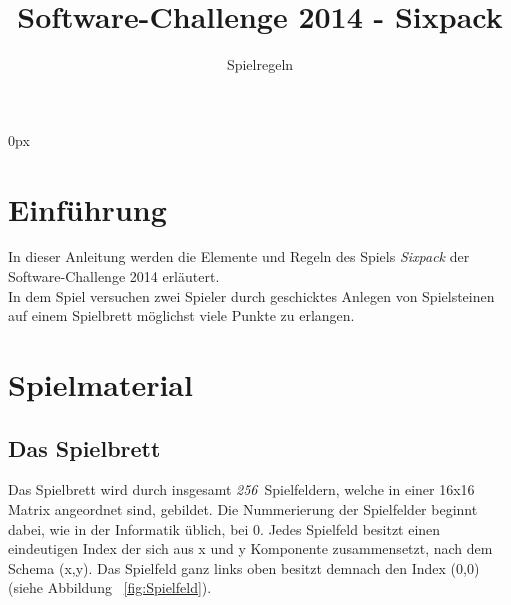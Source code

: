 \documentclass[a4paper, ngerman]{scrartcl}
\title{Software-Challenge 2014 - Sixpack}
\subtitle{Spielregeln}
\newcommand{\SpielFelderAnzahl}{\emph{256}}
\begin{document}
\parindent0px
\maketitle

\begin{figure}[h]
	\centering
\end{figure}
\vspace*{\fill}

\newpage
\tableofcontents
\newpage

\section{Einführung}
In dieser Anleitung werden die Elemente und Regeln des Spiels \emph{Sixpack}
der Software-Challenge 2014 erläutert.\\
In dem Spiel versuchen zwei Spieler durch geschicktes Anlegen von Spielsteinen auf einem Spielbrett möglichst viele Punkte zu erlangen.

\section{Spielmaterial}
	\subsection{Das Spielbrett}
Das Spielbrett wird durch insgesamt \SpielFelderAnzahl\ Spielfeldern, welche in einer 16x16 Matrix angeordnet sind, gebildet. Die Nummerierung der Spielfelder beginnt dabei, wie in der Informatik üblich, bei 0. Jedes Spielfeld besitzt einen eindeutigen Index der sich aus x und y Komponente zusammensetzt, nach dem Schema (x,y). Das Spielfeld ganz links oben besitzt demnach den Index (0,0) (siehe Abbildung ~\ref{fig:Spielfeld}).\\
\end{document}
